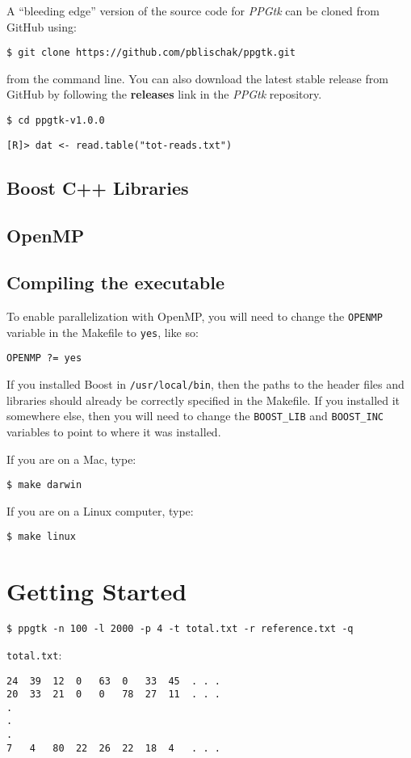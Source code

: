 \documentclass[11pt,english,letterpaper,oneside]{article}
\newcommand{\ppgtk}{\textit{PPGtk}}
\newcommand{\code}[1]{\hspace{15pt} \texttt{#1}}
\begin{document}
A ``bleeding edge'' version of the source code for \ppgtk{} can be cloned from GitHub using:

\code{\$ git clone https://github.com/pblischak/ppgtk.git}

from the command line. You can also download the latest stable release from GitHub by following the \textbf{releases} link in the \ppgtk{} repository.

\code{\$ cd ppgtk-v1.0.0}

\code{[R]> dat <- read.table("tot-reads.txt")}

\subsection{Boost C++ Libraries}

\citep{boostCPP}

\subsection{OpenMP}

\citep{openMP}

\subsection{Compiling the executable}

To enable parallelization with OpenMP, you will need to change the \texttt{OPENMP} variable in the Makefile to \texttt{yes}, like so:

\code{OPENMP ?= yes}

If you installed Boost in \texttt{/usr/local/bin}, then the paths to the header files and libraries should already be correctly specified in the Makefile. If you installed it somewhere else, then you will need to change the \texttt{BOOST\_LIB} and \texttt{BOOST\_INC} variables to point to where it was installed.

If you are on a Mac, type:

\code{\$ make darwin}

If you are on a Linux computer, type:

\code{\$ make linux}

\section{Getting Started}

\code{\$ ppgtk -n 100 -l 2000 -p 4 -t total.txt -r reference.txt -q}

\texttt{total.txt}:

\begin{verbatim}
24	39	12	0	63	0	33	45	. . .
20	33	21	0	0	78	27	11	. . .
.
.
.
7	4	80	22	26	22	18	4	. . .
\end{verbatim}

\newpage



\end{document}
